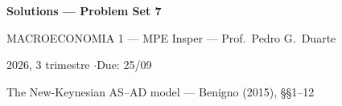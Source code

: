 \documentclass[11pt, a4paper]{article}
\begin{document}
\begin{center}
{\LARGE\bfseries\color{darkblue} Solutions --- Problem Set 7\par}
\vspace{4pt}
{\large MACROECONOMIA 1 --- MPE Insper --- Prof.\ Pedro G.\ Duarte\par}
\vspace{2pt}
{\normalsize 2026, 3\textordmasculine{} trimestre \quad$\cdot$\quad Due: 25/09\par}
\vspace{2pt}
{\small The New-Keynesian AS--AD model --- Benigno (2015), \S\S1--12\par}
\end{center}
\vspace{6pt}
\end{document}
